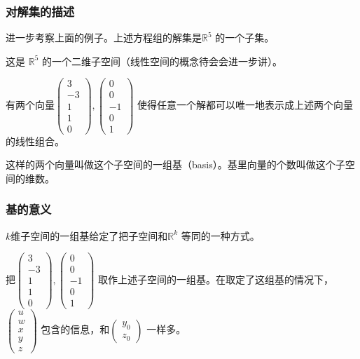 \documentclass[CJK]{beamer}
\begin{document}
\begin{frame}
\frametitle{对解集的描述}
进一步考察上面的例子。上述方程组的\alert{解集}是$\mathbb R^5$ 的一个子集。

这是 $\mathbb R^5$ 的一个二维\alert{子空间}（线性空间的概念待会会进一步讲）。

有两个向量$\begin{pmatrix} 3 \\ -3 \\ 1 \\ 1 \\ 0 \end{pmatrix}, \begin{pmatrix} 0 \\ 0 \\ -1 \\ 0 \\ 1 \end{pmatrix}$ 使得任意一个解都\alert{可以唯一地表示}成上述两个向量的线性组合。

这样的两个向量叫做这个子空间的一组\alert{基}（basis）。基里向量的个数叫做这个子空间的\alert{维数}。

\end{frame}

\begin{frame}
\frametitle{基的意义}
$k$维子空间的一组\alert{基}给定了把子空间和$\mathbb R^k$ \alert{等同}的一种方式。

把$\begin{pmatrix} 3 \\ -3 \\ 1 \\ 1 \\ 0 \end{pmatrix}, \begin{pmatrix} 0 \\ 0 \\ -1 \\ 0 \\ 1 \end{pmatrix}$ 取作上述子空间的一组基。在\alert{取定了这组基}的情况下，$\begin{pmatrix} u \\ w \\ x \\ y \\ z \end{pmatrix}$ 包含的信息，和$\begin{pmatrix} y_0\\z_0 \end{pmatrix}$ 一样多。
\end{frame}
\end{document}
